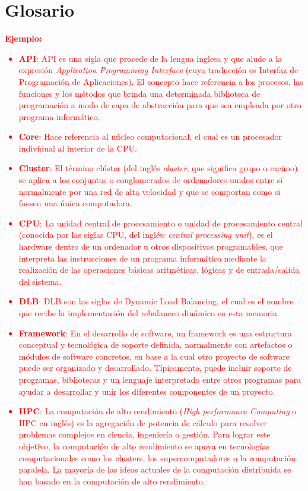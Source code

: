 \chapter{Glosario}
\label{glossary}
\textcolor{red}{\textbf{Ejemplo: }
\begin{itemize}
    \item \textbf{API}: API es una sigla que procede de la lengua inglesa y que alude a la expresión \textit{Application Programming Interface} (cuya traducción es Interfaz de Programación de Aplicaciones). El concepto hace referencia a los procesos, las funciones y los métodos que brinda una determinada biblioteca de programación a modo de capa de abstracción para que sea empleada por otro programa informático.
    \item \textbf{Core}: Hace referencia al núcleo computacional, el cual es un procesador individual al interior de la CPU.
    \item \textbf{Cluster}: El término clúster (del inglés \textit{cluster}, que significa grupo o racimo) se aplica a los conjuntos o conglomerados de ordenadores unidos entre sí normalmente por una red de alta velocidad y que se comportan como si fuesen una única computadora.
    \item \textbf{CPU}: La unidad central de procesamiento o unidad de procesamiento central (conocida por las siglas CPU, del inglés: \textit{central processing unit}), es el hardware dentro de un ordenador u otros dispositivos programables, que interpreta las instrucciones de un programa informático mediante la realización de las operaciones básicas aritméticas, lógicas y de entrada/salida del sistema.
    \item \textbf{DLB}: DLB son las siglas de Dynamic Load Balancing, el cual es el nombre que recibe la implementación del rebalanceo dinámico en esta memoria.
    \item \textbf{Framework}: En el desarrollo de software, un framework es una estructura conceptual y tecnológica de soporte definida, normalmente con artefactos o módulos de software concretos, en base a la cual otro proyecto de software  puede ser organizado y desarrollado. Típicamente, puede incluir soporte de programas, bibliotecas y un lenguaje interpretado  entre otros programas para ayudar a desarrollar y unir los diferentes componentes de un proyecto.
    \item \textbf{HPC}: La computación de alto rendimiento (\textit{High performance Computing} o HPC en inglés) es la agregación de potencia de cálculo para resolver problemas complejos en ciencia, ingeniería o gestión. Para lograr este objetivo, la computación de alto rendimiento se apoya en tecnologías computacionales como los clusters, los supercomputadores o la computación paralela. La mayoría de las ideas actuales de la computación distribuida se han basado en la computación de alto rendimiento.

\end{itemize}}
